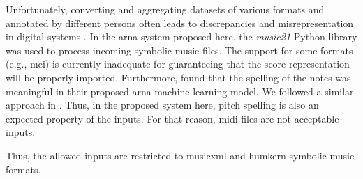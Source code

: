 

Unfortunately, converting and aggregating datasets of
various formats and annotated by different persons often
leads to discrepancies and misrepresentation in digital
systems \parencite{napoleslopez2018encoding,
napoleslopez2019effects}. In the \gls{arna} system proposed
here, the \emph{music21} Python library
\parencite{cuthbert2010music21} was used to process incoming
symbolic music files. The support for some formats (e.g.,
\gls{mei}) is currently inadequate for guaranteeing that the
score representation will be properly imported. Furthermore,
\textcite{micchi2020not} found that the spelling of the
notes was meaningful in their proposed \gls{arna} machine
learning model. We followed a similar approach in
\textcite{napoleslopez2021augmentednet}. Thus, in the
proposed system here, pitch spelling is also an expected
property of the inputs. For that reason, \gls{midi} files
are not acceptable inputs.

Thus, the allowed inputs are restricted to \gls{musicxml}
and \gls{humkern} symbolic music formats.

